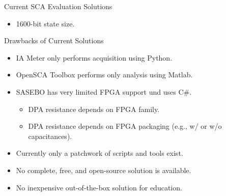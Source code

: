 \documentclass[final]{beamer}
\begin{document}
\begin{frame}[fragile]{}
\begin{columns}[t]
\begin{column}{.31\linewidth}
\begin{block}{Current SCA Evaluation Solutions}
\begin{minipage}[t]{0.49\linewidth}
\begin{itemize}
            \item 1600-bit state size.
          \end{itemize}
        \end{minipage}
      \end{block}
          \begin{block}{Drawbacks of Current Solutions}   
            \begin{itemize}
              \item IA Meter only performs acquisition using Python.
              \item OpenSCA Toolbox performs only analysis using Matlab.
              \item SASEBO has very limited FPGA support und uses C\#.
              \begin{itemize}
                \item DPA resistance depends on FPGA family.
                \item DPA resistance depends on FPGA packaging (e.g., w/ or w/o capacitances).
              \end{itemize}
              \item Currently only a patchwork of scripts and tools exist.
              \item No complete, free, and open-source solution is available.
              \item No inexpensive out-of-the-box solution for education.
            \end{itemize}
          \end{block}
        

\end{column}
\end{columns}
\end{frame}
\end{document}
